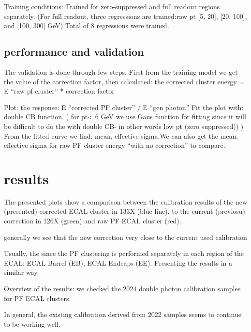 
Training conditions:
Trained for zero-suppressed and full readout regions separately.
(For full readout, three regressions are trained:raw pt [5, 20], [20, 100], and [100, 300] GeV)
Total of 8 regressions were trained.

\subsection{performance and validation}
The validation is done through few steps.
First from the training model we get the value of the correction factor, then  calculated:  the corrected cluster energy = E “raw pf cluster” * correction factor

Plot: the response: E “corrected PF cluster” / E “gen photon”
Fit the plot with: double CB function. ( for pt< 6 GeV we use Gaus function for fitting since it will be difficult to do the with double CB- in other words low pt (zero suppressed)) ) 
From the fitted curve we find: mean, effective sigma.We can also get the mean, effective sigma for raw PF cluster energy “with no correction” to compare.

\section{results}

The presented plots show a comparison between the calibration results of the new (presented) corrected ECAL cluster in 133X (blue line), to the current (previosu)  correction in 126X (green) and  raw PF ECAL cluster (red).

generally we see that the new correction very close to the current used calibration

Usually, the since the PF clustering is performed separately in each region of the ECAL: ECAL Barrel (EB), ECAL Endcaps (EE).
Presenting the results in a similar way.

Overview of the results: we checked the 2024 double photon calibration samples for PF ECAL clusters.

In general, the existing calibration derived from 2022 samples seems to continue to be working well.

